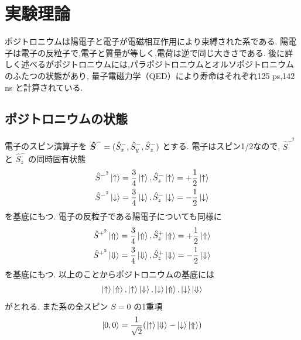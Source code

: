 \chapter{実験理論}\label{theory}



ポジトロニウムは陽電子と電子が電磁相互作用により束縛された系である.
陽電子は電子の反粒子で,電子と質量が等しく,電荷は逆で同じ大きさである.
後に詳しく述べるがポジトロニウムには,パラポジトロニウムとオルソポジトロニウムのふたつの状態があり,
量子電磁力学（QED）により寿命はそれぞれ125 ps,142 ns と計算されている.


\section{ポジトロニウムの状態}

電子のスピン演算子を
$\mbox{\boldmath $\hat{S}$}^{-} = (\hat{S}^{-}_{x},\hat{S}^{-}_{y},\hat{S}^{-}_{z})$
とする.
電子はスピン1/2なので,
$\hat{S}^{-^{2}}$
と
$\hat{S}^{-}_{z}$
の同時固有状態
\begin{equation}
\begin{split}
\hat{S}^{-^{2}} \ket{ \uparrow } = \frac{3}{4} \ket{ \uparrow },
\hat{S}^{-}_{z} \ket{ \uparrow } = + \frac{1}{2} \ket{ \uparrow } \\
\hat{S}^{-^{2}} \ket{ \downarrow } = \frac{3}{4} \ket{ \downarrow },
\hat{S}^{-}_{z} \ket{ \downarrow } = - \frac{1}{2} \ket{ \downarrow }
\end{split}
\label{eq:groundele}
\end{equation}
を基底にもつ.
電子の反粒子である陽電子についても同様に
\begin{equation}
\begin{split}
\hat{S}^{+^{2}} \ket{ \Uparrow } = \frac{3}{4} \ket{ \Uparrow },
\hat{S}^{+}_{z} \ket{ \Uparrow } = + \frac{1}{2} \ket{ \Uparrow } \\
\hat{S}^{+^{2}} \ket{ \Downarrow } = \frac{3}{4} \ket{ \Downarrow },
\hat{S}^{+}_{z} \ket{ \Downarrow } = - \frac{1}{2} \ket{ \Downarrow }
\end{split}
\label{eq:groundeposi}
\end{equation}
を基底にもつ.
以上のことからポジトロニウムの基底には
\begin{equation}
	\nonumber
\ket{ \uparrow } \ket{ \Uparrow },\ket{ \uparrow } \ket{ \Downarrow },
\ket{ \downarrow } \ket{ \Uparrow },\ket{ \downarrow } \ket{ \Downarrow }
\end{equation}
がとれる.
また系の全スピン $S = 0$ の1重項
\begin{equation}
\ket{0,0} = \frac{1}{\sqrt{2}} ( \ket{ \uparrow } \ket{ \Downarrow } - \ket{ \downarrow } \ket{ \Uparrow })
\label{eq:para}
\end{equation}
